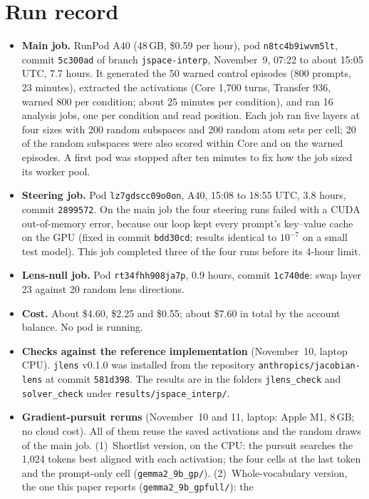 \documentclass[11pt]{article}
\newcommand{\jlens}{\texttt{jlens}}
\begin{document}
\section{Run record}\label{app:run}
\begin{itemize}
\item \textbf{Main job.} RunPod A40 (48\,GB, \$0.59 per hour), pod \texttt{n8tc4b9iwvm5lt}, commit \texttt{5c300ad} of
branch \texttt{jspace-interp}, November~9, 07:22 to about 15:05 UTC, 7.7 hours. It generated the 50 warned control episodes
(800 prompts, 23 minutes), extracted the activations (Core 1{,}700 turns, Transfer 936, warned 800 per condition; about 25
minutes per condition), and ran 16 analysis jobs, one per condition and read position. Each job ran five layers at four
sizes with 200 random subspaces and 200 random atom sets per cell; 20 of the random subspaces were also scored within Core
and on the warned episodes. A first pod was stopped after ten minutes to fix how the job sized its worker pool.
\item \textbf{Steering job.} Pod \texttt{lz7gdscc09o0on}, A40, 15:08 to 18:55 UTC, 3.8 hours, commit \texttt{2899572}. On
the main job the four steering runs failed with a CUDA out-of-memory error, because our loop kept every prompt's
key--value cache on the GPU (fixed in commit \texttt{bdd30cd}; results identical to $10^{-7}$ on a small test model). This
job completed three of the four runs before its 4-hour limit.
\item \textbf{Lens-null job.} Pod \texttt{rt34fhh908ja7p}, 0.9 hours, commit \texttt{1c740de}: swap layer 23 against 20
random lens directions.
\item \textbf{Cost.} About \$4.60, \$2.25 and \$0.55; about \$7.60 in total by the account balance. No pod is running.
\item \textbf{Checks against the reference implementation} (November~10, laptop CPU). \jlens{} v0.1.0 was installed from
the repository \texttt{anthropics/jacobian-lens} at commit \texttt{581d398}. The results are in the folders
\texttt{jlens\_check} and \texttt{solver\_check} under \texttt{results/jspace\_interp/}.
\item \textbf{Gradient-pursuit reruns} (November~10 and 11, laptop: Apple M1, 8\,GB; no cloud cost). All of them reuse
the saved activations and the random draws of the main job. (1)~Shortlist version, on the CPU: the pursuit searches the
1{,}024 tokens best aligned with each activation; the four cells at the last token and the prompt-only cell
(\texttt{gemma2\_9b\_gp/}). (2)~Whole-vocabulary version, the one this paper reports (\texttt{gemma2\_9b\_gpfull/}): the

\end{itemize}
\end{document}
